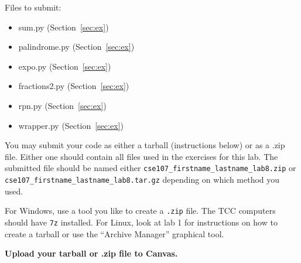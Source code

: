 \documentclass[11pt]{cselabheader}
\begin{document}
Files to submit:
\begin{itemize}
  \item sum.py (Section~\ref{sec:ex}) 
  \item palindrome.py (Section~\ref{sec:ex})
  \item expo.py (Section~\ref{sec:ex})
  \item fractions2.py (Section~\ref{sec:ex})
  \item rpn.py (Section~\ref{sec:ex})
  \item wrapper.py (Section~\ref{sec:ex})
\end{itemize}

You may submit your code as either a tarball (instructions below) or as a .zip
file. Either one should contain all files used in the exercises for this lab.
The submitted file should be named either
\texttt{cse107\_firstname\_lastname\_lab8.zip} or
\texttt{cse107\_firstname\_lastname\_lab8.tar.gz} depending on which method you
used.

For Windows, use a tool you like to create a \texttt{.zip} file. The TCC
computers should have \texttt{7z} installed. For Linux, look at lab 1 for
instructions on how to create a tarball or use the ``Archive Manager'' graphical
tool.

\begin{center}
  \textbf{Upload your tarball or .zip file to Canvas.}
\end{center}
\end{document}
